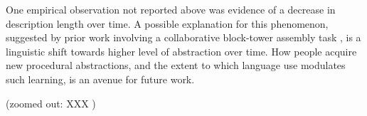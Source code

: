 \documentclass[10pt,letterpaper]{article}
\begin{document}
One empirical observation not reported above was evidence of a decrease in description length over time. 
A possible explanation for this phenomenon, suggested by prior work involving a collaborative block-tower assembly task \cite{mccarthy2021learning}, is a linguistic shift towards higher level of abstraction over time.
How people acquire new procedural abstractions, and the extent to which language use modulates such learning, is an avenue for future work.





(zoomed out: XXX )





\end{document}
